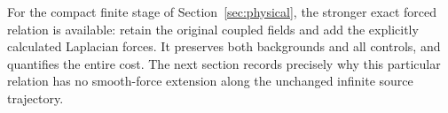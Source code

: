 For the compact finite stage of Section~\ref{sec:physical}, the
stronger exact forced relation is available: retain the original
coupled fields and add the explicitly calculated Laplacian forces.
It preserves both backgrounds and all controls, and quantifies the
entire cost. The next section records precisely why this particular
relation has no smooth-force extension along the unchanged infinite
source trajectory.
